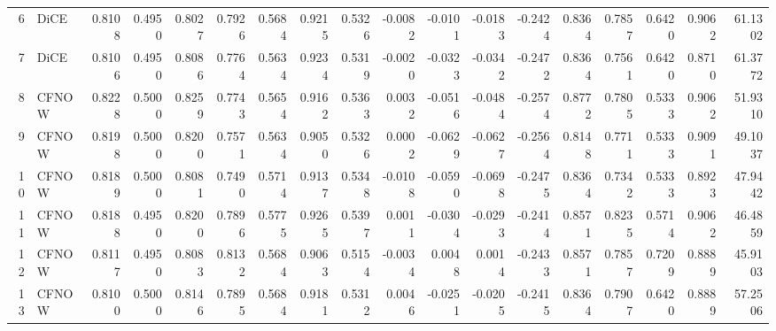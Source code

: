 \begin{tabular}{rlrrrrrrrrrrrrrrrr}
  6 &   DiCE &          0.8108 &  0.4950 &  0.8027 &   0.7926 &          0.5684 &      0.9215 &             0.5326 &                  -0.0082 &             -0.0101 &                   -0.0183 &                          -0.2424 &          0.8364 &         0.7857 &           0.6420 &            0.9062 &      61.1302 \\
  7 &   DiCE &          0.8106 &  0.4950 &  0.8086 &   0.7764 &          0.5634 &      0.9234 &             0.5319 &                  -0.0020 &             -0.0323 &                   -0.0342 &                          -0.2472 &          0.8364 &         0.7561 &           0.6420 &            0.8710 &      61.3772 \\
  8 &  CFNOW &          0.8228 &  0.5000 &  0.8259 &   0.7743 &          0.5654 &      0.9162 &             0.5363 &                   0.0032 &             -0.0516 &                   -0.0484 &                          -0.2574 &          0.8772 &         0.7805 &           0.5333 &            0.9062 &      51.9310 \\
  9 &  CFNOW &          0.8198 &  0.5000 &  0.8200 &   0.7571 &          0.5634 &      0.9050 &             0.5326 &                   0.0002 &             -0.0629 &                   -0.0627 &                          -0.2564 &          0.8148 &         0.7711 &           0.5333 &            0.9091 &      49.1037 \\
 10 &  CFNOW &          0.8189 &  0.5000 &  0.8081 &   0.7490 &          0.5714 &      0.9137 &             0.5348 &                  -0.0108 &             -0.0590 &                   -0.0698 &                          -0.2475 &          0.8364 &         0.7342 &           0.5333 &            0.8923 &      47.9442 \\
 11 &  CFNOW &          0.8188 &  0.4950 &  0.8200 &   0.7896 &          0.5775 &      0.9265 &             0.5397 &                   0.0011 &             -0.0304 &                   -0.0293 &                          -0.2414 &          0.8571 &         0.8235 &           0.5714 &            0.9062 &      46.4859 \\
 12 &  CFNOW &          0.8117 &  0.4950 &  0.8083 &   0.8132 &          0.5684 &      0.9063 &             0.5154 &                  -0.0034 &              0.0048 &                    0.0014 &                          -0.2433 &          0.8571 &         0.7857 &           0.7209 &            0.8889 &      45.9103 \\
 13 &  CFNOW &          0.8100 &  0.5000 &  0.8146 &   0.7895 &          0.5684 &      0.9181 &             0.5312 &                   0.0046 &             -0.0251 &                   -0.0205 &                          -0.2415 &          0.8364 &         0.7907 &           0.6420 &            0.8889 &      57.2506 \\

\end{tabular}
